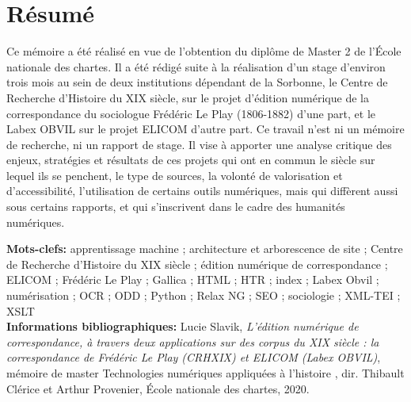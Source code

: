 \chapter*{Résumé}

Ce mémoire a été réalisé en vue de l'obtention du diplôme de Master 2  de l'École nationale des chartes. Il a été rédigé suite à la réalisation d'un stage d'environ trois mois au sein de deux institutions dépendant de la Sorbonne, le Centre de Recherche d'Histoire du XIX siècle, sur le projet d'édition numérique de la correspondance du sociologue Frédéric Le Play (1806-1882) d'une part, et le Labex OBVIL sur le projet ELICOM d'autre part. Ce travail n'est ni un mémoire de recherche, ni un rapport de stage. Il vise à apporter une analyse critique des enjeux, stratégies et résultats de ces projets qui ont en commun le siècle sur lequel ils se penchent, le type de sources, la volonté de valorisation et d'accessibilité, l'utilisation de certains outils numériques, mais qui diffèrent aussi sous certains rapports, et qui s'inscrivent dans le cadre des humanités numériques.\\

\medskip

\textbf{Mots-clefs:} apprentissage machine ; architecture et arborescence de site ; Centre de Recherche d'Histoire du XIX siècle ; édition numérique de correspondance ; ELICOM ; Frédéric Le Play ; Gallica ; HTML ; HTR ; index ; Labex Obvil ; numérisation ; OCR ; ODD ; Python ; Relax NG ; SEO ; sociologie ; XML-TEI ; XSLT\\

\textbf{Informations bibliographiques:} Lucie Slavik, \textit{L’édition numérique de correspondance, à travers deux applications sur des corpus du XIX siècle : la correspondance de Frédéric Le Play (CRHXIX) et ELICOM (Labex OBVIL)},  mémoire de master \og Technologies numériques appliquées à l'histoire \fg{}, dir. Thibault Clérice et Arthur Provenier, École nationale des chartes, 2020.

\clearpage
\thispagestyle{empty}
\cleardoublepage
